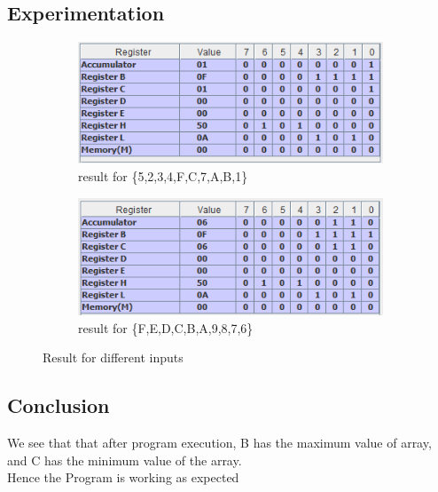 \documentclass[a4paper]{article} %
\begin{document}
    \subsection{Experimentation}
        \begin{figure}[h!]
            \centering
            \begin{subfigure}[b]{0.4\linewidth}
                \centering
                \includegraphics[width=\linewidth]{Assignment 1/2_min-max-10-elem/test 1.png}
                \caption{result for \{5,2,3,4,F,C,7,A,B,1\}}
                \label{fg2a}
            \end{subfigure}
            \begin{subfigure}[b]{0.4\linewidth}
                \centering
                \includegraphics[width=\linewidth]{Assignment 1/2_min-max-10-elem/test 2.png}
                \caption{result for \{F,E,D,C,B,A,9,8,7,6\}}
                \label{fg2b}
            \end{subfigure}
            \caption{Result for different inputs}
            \label{fg2}
        \end{figure}
    \subsection{Conclusion}
        We see that that after program execution, B has the maximum value of array, and C has the minimum value of the array.\\
        Hence the Program is working as expected
\newpage
\end{document}

